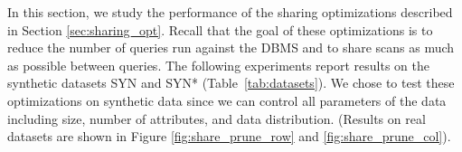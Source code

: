In this section, we study the performance of the sharing optimizations described in Section \ref{sec:sharing_opt}.
Recall that the goal of these optimizations is to reduce the number of queries run against the DBMS and to share scans as much as possible between queries.
The following experiments report results on the synthetic datasets SYN and SYN* 
(Table~\ref{tab:datasets}).
We chose to test these optimizations on synthetic data since we can control all parameters of the data including size, number of attributes, and data distribution.
(Results on real datasets are shown in Figure \ref{fig:share_prune_row} and \ref{fig:share_prune_col}).







